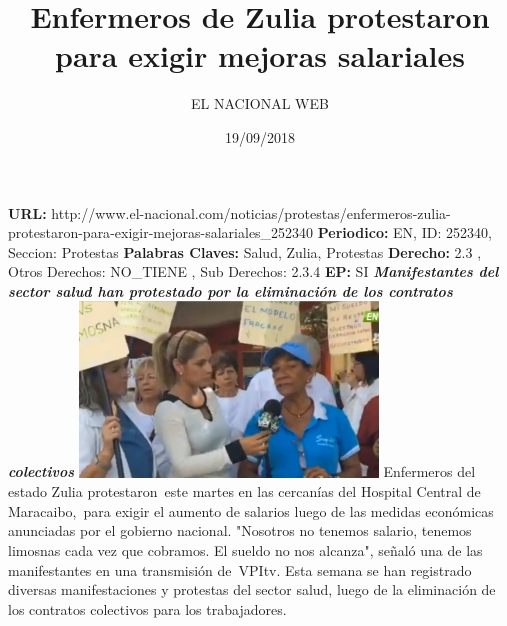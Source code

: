 \documentclass{article}%
\title{\textbf{Enfermeros de Zulia protestaron para exigir mejoras salariales}}%
\author{EL NACIONAL WEB}%
\date{19/09/2018}%
\begin{document}
%
\normalsize%
\maketitle%
\textbf{URL: }%
http://www.el{-}nacional.com/noticias/protestas/enfermeros{-}zulia{-}protestaron{-}para{-}exigir{-}mejoras{-}salariales\_252340\newline%
%
\textbf{Periodico: }%
EN, %
ID: %
252340, %
Seccion: %
Protestas\newline%
%
\textbf{Palabras Claves: }%
Salud, Zulia, Protestas\newline%
%
\textbf{Derecho: }%
2.3%
, Otros Derechos: %
NO\_TIENE%
, Sub Derechos: %
2.3.4%
\newline%
%
\textbf{EP: }%
SI\newline%
\newline%
%
\textbf{\textit{Manifestantes del sector salud han protestado por la eliminación de los contratos colectivos}}%
\newline%
\newline%
%
\includegraphics[width=300px]{143.jpg}%
\newline%
%
Enfermeros del estado Zulia protestaron~este martes en las cercanías del Hospital Central de Maracaibo,~para exigir el aumento de salarios luego de las medidas económicas anunciadas por el gobierno nacional.%
\newline%
%
"Nosotros no tenemos salario, tenemos limosnas cada vez que cobramos. El sueldo no nos alcanza", señaló una de las manifestantes en una transmisión de~VPItv.%
\newline%
%
Esta semana se han registrado diversas manifestaciones y protestas del sector salud, luego de la eliminación de los contratos colectivos para los trabajadores.%
\newline%
%
\end{document}
